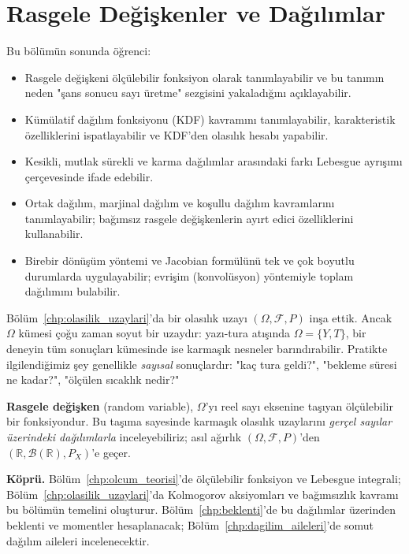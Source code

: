 \chapter{Rasgele Değişkenler ve Dağılımlar}
\label{chp:rasgele_degiskenler}


\begin{kazanimlar}
Bu bölümün sonunda öğrenci:
\begin{itemize}
  \item Rasgele değişkeni ölçülebilir fonksiyon olarak tanımlayabilir ve
        bu tanımın neden "şans sonucu sayı üretme" sezgisini yakaladığını açıklayabilir.
  \item Kümülatif dağılım fonksiyonu (KDF) kavramını tanımlayabilir,
        karakteristik özelliklerini ispatlayabilir ve KDF'den olasılık hesabı yapabilir.
  \item Kesikli, mutlak sürekli ve karma dağılımlar arasındaki farkı
        Lebesgue ayrışımı çerçevesinde ifade edebilir.
  \item Ortak dağılım, marjinal dağılım ve koşullu dağılım kavramlarını
        tanımlayabilir; bağımsız rasgele değişkenlerin ayırt edici özelliklerini kullanabilir.
  \item Birebir dönüşüm yöntemi ve Jacobian formülünü tek ve çok boyutlu
        durumlarda uygulayabilir; evrişim (konvolüsyon) yöntemiyle toplam dağılımını bulabilir.
\end{itemize}
\end{kazanimlar}

\begin{motivasyon}
Bölüm~\ref{chp:olasilik_uzaylari}'da bir olasılık uzayı $(\Omega, \mathcal{F}, P)$ inşa ettik.
Ancak $\Omega$ kümesi çoğu zaman soyut bir uzaydır: yazı-tura atışında
$\Omega = \{Y, T\}$, bir deneyin tüm sonuçları kümesinde ise karmaşık nesneler barındırabilir.
Pratikte ilgilendiğimiz şey genellikle \emph{sayısal} sonuçlardır:
"kaç tura geldi?", "bekleme süresi ne kadar?", "ölçülen sıcaklık nedir?"

\textbf{Rasgele değişken} (random variable), $\Omega$'yı reel sayı eksenine taşıyan
ölçülebilir bir fonksiyondur. Bu taşıma sayesinde karmaşık olasılık uzaylarını
\emph{gerçel sayılar üzerindeki dağılımlarla} inceleyebiliriz; asıl ağırlık
$(\Omega, \mathcal{F}, P)$'den $(\mathbb{R}, \mathcal{B}(\mathbb{R}), P_X)$'e geçer.

\medskip
\textbf{Köprü.} Bölüm~\ref{chp:olcum_teorisi}'de ölçülebilir fonksiyon ve
Lebesgue integrali; Bölüm~\ref{chp:olasilik_uzaylari}'da Kolmogorov aksiyomları
ve bağımsızlık kavramı bu bölümün temelini oluşturur.
Bölüm~\ref{chp:beklenti}'de bu dağılımlar üzerinden beklenti ve momentler hesaplanacak;
Bölüm~\ref{chp:dagilim_aileleri}'de somut dağılım aileleri incelenecektir.
\end{motivasyon}

